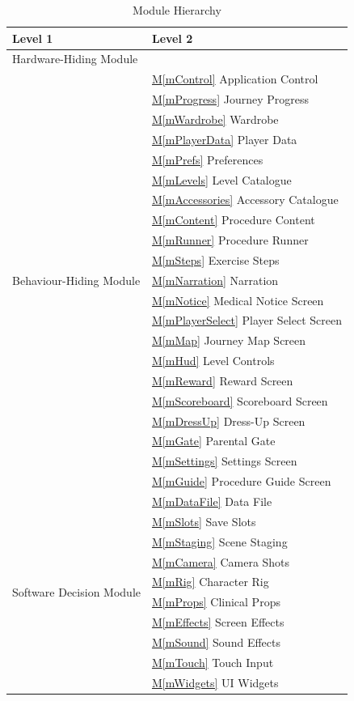 \documentclass[12pt, titlepage]{article}
\newcommand{\mref}[1]{\hyperref[#1]{M\ref*{#1}}}
\begin{document}
\begin{table}[h!]
\centering
\begin{tabular}{p{} p{}}
\toprule
\textbf{Level 1} & \textbf{Level 2}\\
\midrule

{Hardware-Hiding Module} & ~ \\
\midrule

\multirow{21}{0.3\textwidth}{Behaviour-Hiding Module}
& \mref{mControl} Application Control\\
& \mref{mProgress} Journey Progress\\
& \mref{mWardrobe} Wardrobe\\
& \mref{mPlayerData} Player Data\\
& \mref{mPrefs} Preferences\\
& \mref{mLevels} Level Catalogue\\
& \mref{mAccessories} Accessory Catalogue\\
& \mref{mContent} Procedure Content\\
& \mref{mRunner} Procedure Runner\\
& \mref{mSteps} Exercise Steps\\
& \mref{mNarration} Narration\\
& \mref{mNotice} Medical Notice Screen\\
& \mref{mPlayerSelect} Player Select Screen\\
& \mref{mMap} Journey Map Screen\\
& \mref{mHud} Level Controls\\
& \mref{mReward} Reward Screen\\
& \mref{mScoreboard} Scoreboard Screen\\
& \mref{mDressUp} Dress-Up Screen\\
& \mref{mGate} Parental Gate\\
& \mref{mSettings} Settings Screen\\
& \mref{mGuide} Procedure Guide Screen\\
\midrule

\multirow{10}{0.3\textwidth}{Software Decision Module}
& \mref{mDataFile} Data File\\
& \mref{mSlots} Save Slots\\
& \mref{mStaging} Scene Staging\\
& \mref{mCamera} Camera Shots\\
& \mref{mRig} Character Rig\\
& \mref{mProps} Clinical Props\\
& \mref{mEffects} Screen Effects\\
& \mref{mSound} Sound Effects\\
& \mref{mTouch} Touch Input\\
& \mref{mWidgets} UI Widgets\\
\bottomrule

\end{tabular}
\caption{Module Hierarchy}
\label{TblMH}
\end{table}
\end{document}
